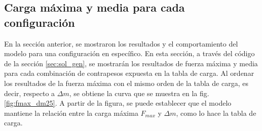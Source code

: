 %
 
\newpage
 
\subsection{Carga máxima y media para cada configuración} 

En la sección anterior, se mostraron los resultados y el comportamiento del modelo para una configuración en específico. En esta sección, a través del código de la sección \ref{sec:sol_gen}, se mostrarán los resultados de fuerza máxima y media para cada combinación de contrapesos expuesta en la tabla de carga. Al ordenar los resultados de la fuerza máxima con el mismo orden de la tabla de carga, es decir, respecto a $\Delta m$, se obtiene la curva que se muestra en la fig. \ref{fig:fmax_dm25}. A partir de la figura, se puede establecer que el modelo mantiene la relación entre la carga máxima $F_{max}$ y $\Delta m$, como lo hace la tabla de carga.

